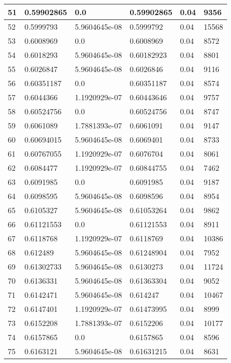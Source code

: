 \begin{longtable}{|l|l|l|l|l|l|}
51 & 0.59902865 & 0.0 & 0.59902865 & 0.04 & 9356 \\ \hline 
52 & 0.5999793 & 5.9604645e-08 & 0.5999792 & 0.04 & 15568 \\ \hline 
53 & 0.6008969 & 0.0 & 0.6008969 & 0.04 & 8572 \\ \hline 
54 & 0.6018293 & 5.9604645e-08 & 0.60182923 & 0.04 & 8801 \\ \hline 
55 & 0.6026847 & 5.9604645e-08 & 0.6026846 & 0.04 & 9116 \\ \hline 
56 & 0.60351187 & 0.0 & 0.60351187 & 0.04 & 8574 \\ \hline 
57 & 0.6044366 & 1.1920929e-07 & 0.60443646 & 0.04 & 9757 \\ \hline 
58 & 0.60524756 & 0.0 & 0.60524756 & 0.04 & 8747 \\ \hline 
59 & 0.6061089 & 1.7881393e-07 & 0.6061091 & 0.04 & 9147 \\ \hline 
60 & 0.60694015 & 5.9604645e-08 & 0.6069401 & 0.04 & 8733 \\ \hline 
61 & 0.60767055 & 1.1920929e-07 & 0.6076704 & 0.04 & 8061 \\ \hline 
62 & 0.6084477 & 1.1920929e-07 & 0.60844755 & 0.04 & 7462 \\ \hline 
63 & 0.6091985 & 0.0 & 0.6091985 & 0.04 & 9187 \\ \hline 
64 & 0.6098595 & 5.9604645e-08 & 0.6098596 & 0.04 & 8954 \\ \hline 
65 & 0.6105327 & 5.9604645e-08 & 0.61053264 & 0.04 & 9862 \\ \hline 
66 & 0.61121553 & 0.0 & 0.61121553 & 0.04 & 8911 \\ \hline 
67 & 0.6118768 & 1.1920929e-07 & 0.6118769 & 0.04 & 10386 \\ \hline 
68 & 0.612489 & 5.9604645e-08 & 0.61248904 & 0.04 & 7952 \\ \hline 
69 & 0.61302733 & 5.9604645e-08 & 0.6130273 & 0.04 & 11724 \\ \hline 
70 & 0.6136331 & 5.9604645e-08 & 0.61363304 & 0.04 & 9052 \\ \hline 
71 & 0.6142471 & 5.9604645e-08 & 0.614247 & 0.04 & 10467 \\ \hline 
72 & 0.6147401 & 1.1920929e-07 & 0.61473995 & 0.04 & 8999 \\ \hline 
73 & 0.6152208 & 1.7881393e-07 & 0.6152206 & 0.04 & 10177 \\ \hline 
74 & 0.6157865 & 0.0 & 0.6157865 & 0.04 & 8596 \\ \hline 
75 & 0.6163121 & 5.9604645e-08 & 0.61631215 & 0.04 & 8631 \\ \hline 
\end{longtable}
